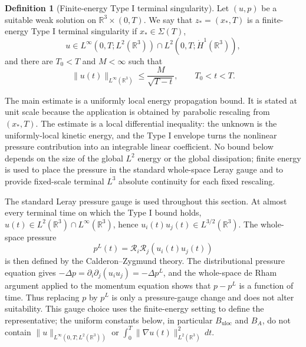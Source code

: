 \documentclass[11pt]{amsart}
\theoremstyle{plain}
\theoremstyle{definition}
\newtheorem{definition}[definition]{Definition}
\theoremstyle{remark}
\numberwithin{equation}{section}
\begin{document}
\begin{definition}[Finite-energy Type I terminal singularity]
\label{p0:def:finite-energy-typeI-paper0}
Let \((u,p)\) be a suitable weak solution on \(\mathbb R^3\times(0,T)\).
We say that \(z_*=(x_*,T)\) is a finite-energy Type I terminal singularity if
\(x_*\in\Sigma(T)\),
\[
  u\in L^\infty(0,T;L^2(\mathbb R^3))
  \cap L^2(0,T;\dot H^1(\mathbb R^3)),
\]
and there are \(T_0<T\) and \(M<\infty\) such that
\begin{equation}\label{p0:eq:paper0-global-typeI}
  \|u(t)\|_{L^\infty(\mathbb R^3)}
  \le \frac{M}{\sqrt{T-t}},
  \qquad T_0<t<T .
\end{equation}
\end{definition}

The main estimate is a uniformly local energy propagation bound.  It is stated
at unit scale because the application is obtained by parabolic rescaling from
\((x_*,T)\).  The estimate is a local differential inequality: the unknown is the
uniformly-local kinetic energy, and the Type I envelope turns the nonlinear
pressure contribution into an integrable linear coefficient.  No bound below
depends on the size of the global \(L^2\) energy or the global dissipation;
finite energy is used to place the pressure in the standard whole-space
Leray gauge and to provide fixed-scale terminal \(L^3\) absolute continuity
for each fixed rescaling.

The standard Leray pressure gauge is used throughout this section.  At almost
every terminal time on which the Type I bound holds,
\(u(t)\in L^2(\mathbb R^3)\cap L^\infty(\mathbb R^3)\), hence
\(u_i(t)u_j(t)\in L^{3/2}(\mathbb R^3)\).  The whole-space pressure
\[
  p^L(t)=\mathcal R_i\mathcal R_j(u_i(t)u_j(t))
\]
is then defined by the Calderon--Zygmund theory.  The distributional pressure
equation gives
\(-\Delta p=\partial_i\partial_j(u_i u_j)=-\Delta p^L\), and the whole-space
de Rham argument applied to the momentum equation shows that \(p-p^L\) is a
function of time.  Thus replacing \(p\) by \(p^L\) is only a pressure-gauge
change and does not alter suitability.  This gauge choice uses the
finite-energy setting to define the representative; the uniform constants
below, in particular \(B_{\mathrm{uloc}}\) and \(B_A\), do not contain
\(\|u\|_{L^\infty(0,T;L^2(\mathbb R^3))}\) or
\(\int_0^T\|\nabla u(t)\|_{L^2(\mathbb R^3)}^2\,dt\).
\end{document}
